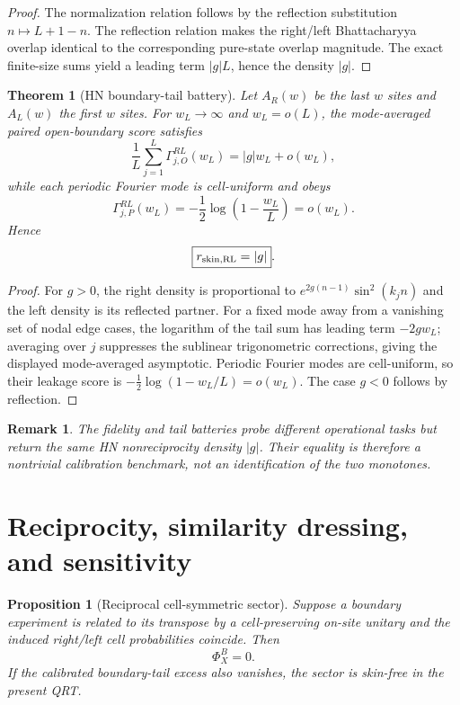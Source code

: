 \documentclass[11pt]{article}
\newtheorem{theorem}{Theorem}
\newtheorem{proposition}{Proposition}
\newtheorem{remark}{Remark}
\begin{document}
\begin{proof}
The normalization relation follows by the reflection substitution \(n\mapsto L+1-n\). The reflection relation makes the right/left Bhattacharyya overlap identical to the corresponding pure-state overlap magnitude. The exact finite-size sums yield a leading term \(|g|L\), hence the density \(|g|\).
\end{proof}

\begin{theorem}[HN boundary-tail battery]
Let $A_R(w)$ be the last $w$ sites and $A_L(w)$ the first $w$ sites. For $w_L\to\infty$ and $w_L=o(L)$, the mode-averaged paired open-boundary score satisfies
\[
\frac1L\sum_{j=1}^{L}\Gamma_{j,O}^{RL}(w_L)
=|g|w_L+o(w_L),
\]
while each periodic Fourier mode is cell-uniform and obeys
\[
\Gamma_{j,P}^{RL}(w_L)
=-\frac12\log\left(1-\frac{w_L}{L}\right)=o(w_L).
\]
Hence
\[
\boxed{r_{\rm skin,RL}=|g|}.
\]
\end{theorem}

\begin{proof}
For $g>0$, the right density is proportional to $e^{2g(n-1)}\sin^2(k_jn)$ and the left density is its reflected partner. For a fixed mode away from a vanishing set of nodal edge cases, the logarithm of the tail sum has leading term $-2gw_L$; averaging over $j$ suppresses the sublinear trigonometric corrections, giving the displayed mode-averaged asymptotic. Periodic Fourier modes are cell-uniform, so their leakage score is $-\frac12\log(1-w_L/L)=o(w_L)$. The case $g<0$ follows by reflection.
\end{proof}

\begin{remark}
The fidelity and tail batteries probe different operational tasks but return the same HN nonreciprocity density \(|g|\). Their equality is therefore a nontrivial calibration benchmark, not an identification of the two monotones.
\end{remark}

\section{Reciprocity, similarity dressing, and sensitivity}

\begin{proposition}[Reciprocal cell-symmetric sector]
Suppose a boundary experiment is related to its transpose by a cell-preserving on-site unitary and the induced right/left cell probabilities coincide. Then
\[
\Phi_X^B=0.
\]
If the calibrated boundary-tail excess also vanishes, the sector is skin-free in the present QRT.
\end{proposition}
\end{document}
